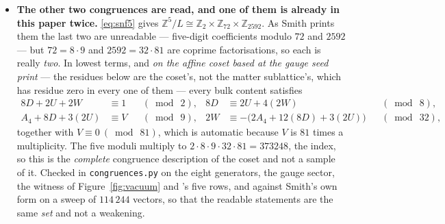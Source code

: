 \documentclass[11pt,a4paper]{article}
\newcommand{\ZZ}{\mathbb{Z}}
\begin{document}
\begin{itemize}
Two measurements say how sharp, and they are in \texttt{anchor\_\allowbreak delta.py}. First, the
residual is \emph{not} a function of the parity-blind moments: rows (1) and (2) of \cite{KM25}'s
table have identical $S_0,S_1,S_2$ to the last digit --- $87.5$, $179.5$, $707.5$ --- and their
residuals differ by twenty-five per cent, which no ordering over five collinear points could have
established. Second, the split is a near-cancellation: $D=A_2-\tfrac34B_2$ is $78.000-76.125$ on
row (1), a $2.4\%$ residue, and the leverage that gives is measured rather than estimated: rows (1)
and (2) differ by one per cent in the split, $78.000-76.125$ against $79.000-75.375$, and their $D$
differ by a factor of $1.93$ --- so $\alpha_{\min}\sim\sqrt D$ moves by $39\%$, the size of the
residual itself. Rescaling the
antiperiodic sector by a single $\lambda$ does not repair the five rows, and it is $\lambda-1$ that
has to be judged: the required perturbation runs from $0.2\%$ to $1.4\%$, a factor of seven, so
this joins the one-parameter repairs already excluded in Part~VI. But it is of one sign and of
\emph{that} order on every row, which changes what the caveat asserts. It is not that the potential
is wrong by a factor of two; it is that one trace may be wrong in its second digit, in the one
place where $D$ has no room.
\item \textbf{The other two congruences are read, and one of them is already in this paper twice.}
\eqref{eq:snf5} gives $\ZZ^5/L\cong\ZZ_2\times\ZZ_{72}\times\ZZ_{2592}$. As Smith prints them the
last two are unreadable --- five-digit coefficients modulo $72$ and $2592$ --- but $72=8\cdot9$ and
$2592=32\cdot81$ are coprime factorisations, so each is really \emph{two}. In lowest terms, and
\emph{on the affine coset based at the gauge seed \cite{KM25} print} --- the residues below are the
coset's, not the matter sublattice's, which has residue zero in every one of them --- every bulk
content satisfies
\begin{equation}\label{eq:congr5}
\begin{aligned}
  8D+2U+2W&\equiv1 &&(\bmod\ 2), &  8D&\equiv 2U+4(2W) &&(\bmod\ 8),\\
  A_4+8D+3(2U)&\equiv V &&(\bmod\ 9), &
  2W&\equiv-\bigl(2A_4+12(8D)+3(2U)\bigr) &&(\bmod\ 32),
\end{aligned}
\end{equation}
together with $V\equiv0\ (\bmod\ 81)$, which is automatic because $V$ is $81$ times a multiplicity.
The five moduli multiply to $2\cdot8\cdot9\cdot32\cdot81=373248$, the index, so this is the
\emph{complete} congruence description of the coset and not a sample of it. Checked in
\texttt{congruences.py} on the eight generators, the gauge sector, the witness of
Figure~\ref{fig:vacuum} and \cite{KM25}'s five rows, and against Smith's own form on a sweep of
$114\,244$ vectors, so that the readable statements are the same \emph{set} and not a weakening.


\end{itemize}
\end{document}
